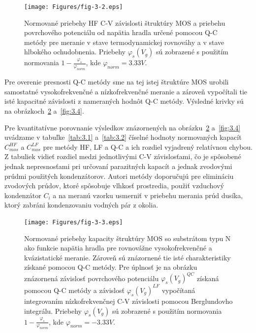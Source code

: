 \begin{figure}[h!]\centering
  \texttt{[image: Figures/fig-3-2.eps]}
  \caption[Normované priebehy HF C-V závislosti štruktúry MOS a priebehu
  povrchového potenciálu od napätia hradla určené pomocou Q-C metódy
  pre meranie v stave termodynamickej rovnováhy a v stave hlbokého
  ochudobnenia]{Normované priebehy HF C-V závislosti štruktúry
  MOS a priebehu povrchového potenciálu od napätia hradla určené
  pomocou Q-C metódy pre meranie v stave termodynamickej rovnováhy a v
  stave hlbokého ochudobnenia. Priebehy $\varphi_s(V_g)$ sú zobrazené
  s použitím normovania $1 - \frac{\varphi_s}{\varphi_{norm}}$, kde
  $\varphi_{norm}=3.33V$.}\label{fig:3.2}
\end{figure}

Pre overenie presnosti Q-C metódy sme na tej istej štruktúre MOS
urobili samostatné vysokofrekvenčné a nízkofrekvenčné meranie a
zároveň vypočítali tie isté kapacitné závislosti z nameraných hodnôt
Q-C metódy.  Výsledné krivky sú na obrázkoch~\ref{fig:3.3} a~\ref{fig:3.4}.

Pre kvantitatívne porovnanie výsledkov znázornených na
obrázku~\ref{fig:3.3} a~\ref{fig:3.4} uvádzame v tabuľke~\ref{tab:3.1}
a~\ref{tab:3.2} číselné hodnoty normovaných kapacít $C^{HF}_{mos}$ a
$C^{LF}_{mos}$ pre metódy HF, LF a Q-C a ich rozdiel vyjadrený
relatívnou chybou. Z tabuliek vidieť rozdiel medzi jednotlivými C-V
závislosťami, čo je spôsobené jednak nepresnosťami pri určovaní
parazitných kapacít a jednak zvodovými prúdmi použitých
kondenzátorov. Autori metódy doporučujú pre elimináciu zvodových
prúdov, ktoré spôsobuje vlhkosť prostredia, použiť vzduchový
kondenzátor $C_i$ a na meranú vzorku usmerniť v priebehu merania prúd
dusíka, ktorý zabráni kondenzovaniu vodných pár z okolia.

\newpage
\begin{figure}[h!]\centering
  \texttt{[image: Figures/fig-3-3.eps]}
  \caption[Normované priebehy kapacity štruktúry MOS so substrátom typu
  N ako funkcie napätia hradla pre rovnovážne vysokofrekvenčné a
  kvázistatické meranie]{Normované priebehy kapacity štruktúry MOS so
  substrátom typu N ako funkcie napätia hradla pre rovnovážne
  vysokofrekvenčné a kvázistatické meranie.  Zároveň sú znázornené tie
  isté charakteristiky získané pomocou Q-C metódy. Pre úplnosť je na
  obrázku znázornená závislosť povrchového potenciálu
  ${\varphi_s(V_g)}^{QC}$ získaná pomocou Q-C metódy a závislosť
  ${\varphi_s(V_g)}^{LF}$ vypočítaná integrovaním nízkofrekvenčnej C-V
  závislosti pomocou Berglundovho integrálu.  Priebehy
  $\varphi_s(V_g)$ sú zobrazené s použitím normovania $1 -
  \frac{\varphi_s}{\varphi_{norm}}$, kde $\varphi_{norm}=-3.33V$.}\label{fig:3.3}
\end{figure}

